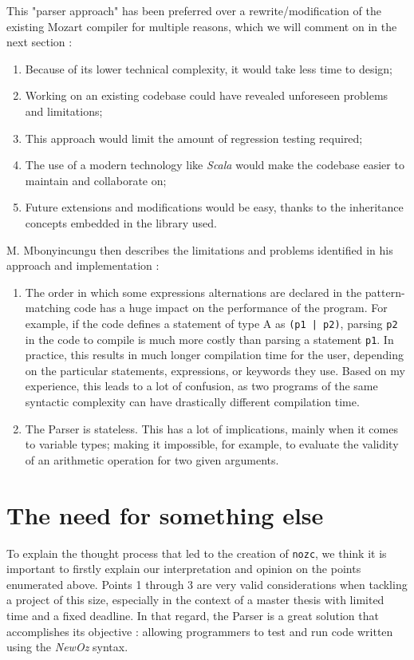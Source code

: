 This "parser approach" has been preferred over a rewrite/modification of the existing Mozart compiler for multiple reasons, which we will comment on in the next section :
\begin{enumerate}
    \item Because of its lower technical complexity, it would take less time to design;
    \item Working on an existing codebase could have revealed unforeseen problems and limitations;
    \item This approach would limit the amount of regression testing required;
    \item The use of a modern technology like \textit{Scala} would make the codebase easier to maintain and collaborate on;
    \item Future extensions and modifications would be easy, thanks to the inheritance concepts embedded in the library used.
\end{enumerate}
M. Mbonyincungu then describes the limitations and problems identified in his approach and implementation :
\begin{enumerate}[resume]
    \item The order in which some expressions alternations are declared in the pattern-matching code has a huge impact on the performance of the program.
    For example, if the code defines a statement of type A as \texttt{(p1 | p2)}, parsing \texttt{p2} in the code to compile is much more costly than parsing a statement \texttt{p1}.
    In practice, this results in much longer compilation time for the user, depending on the particular statements, expressions, or keywords they use.
    Based on my experience, this leads to a lot of confusion, as two programs of the same syntactic complexity can have drastically different compilation time.
    \item The Parser is stateless.
    This has a lot of implications, mainly when it comes to variable types;
    making it impossible, for example, to evaluate the validity of an arithmetic operation for two given arguments.
\end{enumerate}

\section{The need for something else}\label{sec:ch3-problems}
To explain the thought process that led to the creation of \texttt{nozc}, we think it is important to firstly explain our interpretation and opinion on the points enumerated above.
Points 1 through 3 are very valid considerations when tackling a project of this size, especially in the context of a master thesis with limited time and a fixed deadline.
In that regard, the Parser is a great solution that accomplishes its objective : allowing programmers to test and run code written using the \textit{NewOz} syntax.\newline

